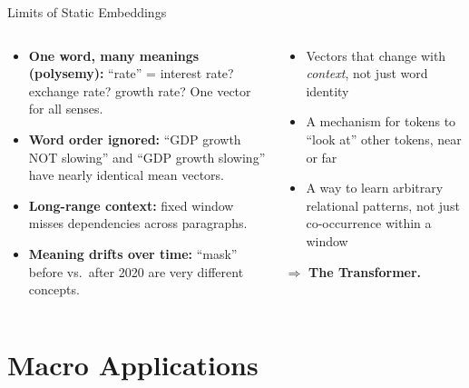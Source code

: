 \begin{frame}{Limits of Static Embeddings}
\begin{columns}[T]
\begin{tcolorbox}[colback=red!5, colframe=red!50!black, title=\textbf{What static embeddings miss}]
\begin{itemize}
\item \textbf{One word, many meanings (polysemy):} ``rate'' = interest rate? exchange rate? growth rate? One vector for all senses.
\item \textbf{Word order ignored:} ``GDP growth NOT slowing'' and ``GDP growth slowing'' have nearly identical mean vectors.
\item \textbf{Long-range context:} fixed window misses dependencies across paragraphs.
\item \textbf{Meaning drifts over time:} ``mask'' before vs.\ after 2020 are very different concepts.
\end{itemize}
\end{tcolorbox}

\begin{tcolorbox}[colback=green!5, colframe=green!40!black, title=\textbf{What we need next}]
\begin{itemize}
\item Vectors that change with \emph{context}, not just word identity
\item A mechanism for tokens to ``look at'' other tokens, near or far
\item A way to learn arbitrary relational patterns, not just co-occurrence within a window
\end{itemize}
\medskip
$\Longrightarrow$ \textbf{The Transformer.}
\end{tcolorbox}
\end{columns}
\end{frame}

\section{Macro Applications}

